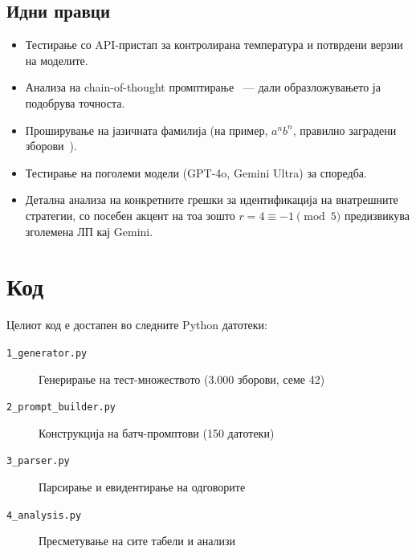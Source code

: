 \documentclass[12pt,a4paper]{article}
\theoremstyle{definition}
\begin{document}
\subsection{Идни правци}

\begin{itemize}
  \item Тестирање со API-пристап за контролирана температура и потврдени верзии на моделите.
  \item Анализа на chain-of-thought промптирање~\cite{wei2022chain} --- дали образложувањето ја подобрува точноста.
  \item Проширување на јазичната фамилија (на пример, $a^nb^n$, правилно заградени зборови~\cite{deletang2023chomsky}).
  \item Тестирање на поголеми модели (GPT-4o, Gemini Ultra) за споредба.
  \item Детална анализа на конкретните грешки за идентификација на внатрешните стратегии, со посебен акцент на тоа зошто $r=4 \equiv -1 \pmod 5$ предизвикува зголемена ЛП кај Gemini.
\end{itemize}

\printbibliography[heading=bibintoc, title={Литература}]

\appendix
\section{Код}

Целиот код е достапен во следните Python датотеки:

\begin{description}
  \item[\texttt{1\_generator.py}] Генерирање на тест-множеството (3.000 зборови, семе 42)
  \item[\texttt{2\_prompt\_builder.py}] Конструкција на батч-промптови (150 датотеки)
  \item[\texttt{3\_parser.py}] Парсирање и евидентирање на одговорите
  \item[\texttt{4\_analysis.py}] Пресметување на сите табели и анализи
\end{description}


\end{document}
